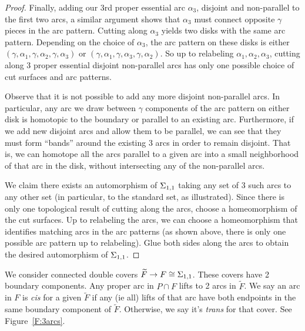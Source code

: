 \begin{proof}
Finally, adding our 3rd proper essential arc $\alpha_3$, disjoint and
non-parallel to the first two arcs, a similar argument shows that $\alpha_3$
must connect opposite $\gamma$ pieces in the arc pattern. Cutting along
$\alpha_3$ yields two disks with the same arc pattern. Depending on the choice
of $\alpha_3$, the arc pattern on these disks is either
$(\gamma,\alpha_1,\gamma,\alpha_2,\gamma,\alpha_3)$ or
$(\gamma,\alpha_1,\gamma,\alpha_3,\gamma,\alpha_2)$. So up to relabeling
$\alpha_1,\alpha_2,\alpha_3$, cutting along 3 proper essential disjoint
non-parallel arcs has only one possible choice of cut surfaces and arc
patterns.

Observe that it is not possible to add any more disjoint non-parallel arcs. In
particular, any arc we draw between $\gamma$ components of the arc pattern on
either disk is homotopic to the boundary or parallel to an existing arc.
Furthermore, if we add new disjoint arcs and allow them to be parallel, we can
see that they must form ``bands'' around the existing 3 arcs in order to remain
disjoint. That is, we can homotope all the arcs parallel to a given arc into
a small neighborhood of that arc in the disk, without intersecting any of the
non-parallel arcs.

We claim there exists an automorphism of $\Sigma_{1,1}$ taking any set of 3 such
arcs to any other set (in particular, to the standard set, as illustrated).
Since there is only one topological result of cutting along the arcs, choose
a homeomorphism of the cut surfaces. Up to relabeling the arcs, we can choose
a homeomorphism that identifies matching arcs in the arc patterns (as shown
above, there is only one possible arc pattern up to relabeling). Glue both
sides along the arcs to obtain the desired automorphism of $\Sigma_{1,1}$.

\end{proof}

We consider connected double covers $\widetilde{F} \to F \cong \Sigma_{1,1}$.
These covers have 2 boundary components. Any proper arc in $P \cap F$ lifts to
2 arcs in $\widetilde{F}$.  We say an arc in $F$ is \emph{cis} for a given
$\widetilde{F}$ if any (ie all) lifts of that arc have both endpoints in the
same boundary component of $\widetilde{F}$.  Otherwise, we say it's
\emph{trans} for that cover. See Figure~\ref{F:3arcs}.


